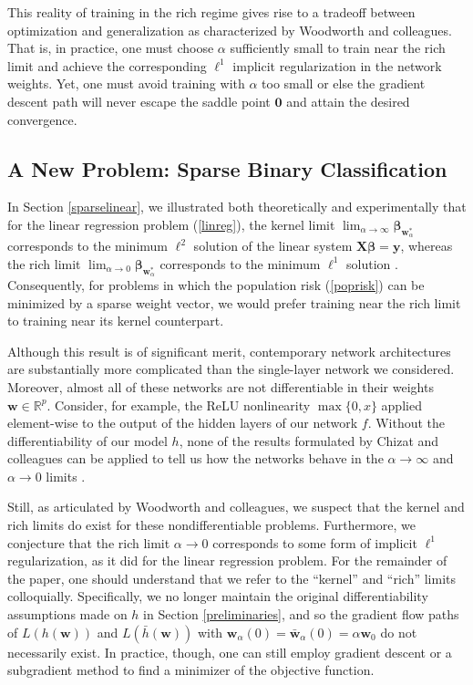\documentclass{article}
\begin{document}
This reality of training in the rich regime gives rise to a tradeoff between optimization and generalization as characterized by Woodworth and colleagues. That is, in practice, one must choose $\alpha$ sufficiently small to train near the rich limit and achieve the corresponding $\ell^1$ implicit regularization in the network weights. Yet, one must avoid training with $\alpha$ too small or else the gradient descent path will never escape the saddle point $\boldsymbol{0}$ and attain the desired convergence.

\subsection{A New Problem: Sparse Binary Classification}\label{sparselogistic}
In Section \ref{sparselinear}, we illustrated both theoretically and experimentally that for the linear regression problem (\ref{linreg}), the kernel limit $\lim_{\alpha \to \infty}\boldsymbol{\beta}_{\boldsymbol{w}_{\alpha}^*}$ corresponds to the minimum $\ell^2$ solution of the linear system $\boldsymbol{X} \boldsymbol{\beta} = \boldsymbol{y}$, whereas the rich limit $\lim_{\alpha \to 0}\boldsymbol{\beta}_{\boldsymbol{w}_{\alpha}^*}$ corresponds to the minimum $\ell^1$ solution \cite{woodworth2020kernel}. Consequently, for problems in which the population risk (\ref{poprisk}) can be minimized by a sparse weight vector, we would prefer training near the rich limit to training near its kernel counterpart. 

Although this result is of significant merit, contemporary network architectures are substantially more complicated than the single-layer network we considered. Moreover, almost all of these networks are not differentiable in their weights $\boldsymbol{w} \in \mathbb{R}^p$. Consider, for example, the ReLU nonlinearity $\max\{0, x \}$ applied element-wise to the output of the hidden layers of our network $f$. Without the differentiability of our model $h$, none of the results formulated by Chizat and colleagues can be applied to tell us how the networks behave in the $\alpha \rightarrow \infty$ and $\alpha \rightarrow 0$ limits \cite{chizat2018note}. 

Still, as articulated by Woodworth and colleagues, we suspect that the kernel and rich limits do exist for these nondifferentiable problems. Furthermore, we conjecture that the rich limit $\alpha \rightarrow 0$ corresponds to some form of implicit $\ell^1$ regularization, as it did for the linear regression problem. For the remainder of the paper, one should understand that we refer to the \enquote{kernel} and \enquote{rich} limits colloquially. Specifically, we no longer maintain the original differentiability assumptions made on $h$ in Section \ref{preliminaries}, and so the gradient flow paths of $L(h(\boldsymbol{w}))$ and $L(\bar{h}(\boldsymbol{w}))$ with $\boldsymbol{w}_{\alpha}(0) = \boldsymbol{\bar{w}}_{\alpha}(0) = \alpha \boldsymbol{w}_0$ do not necessarily exist. In practice, though, one can still employ gradient descent or a subgradient method to find a minimizer of the objective function. 
\end{document}
